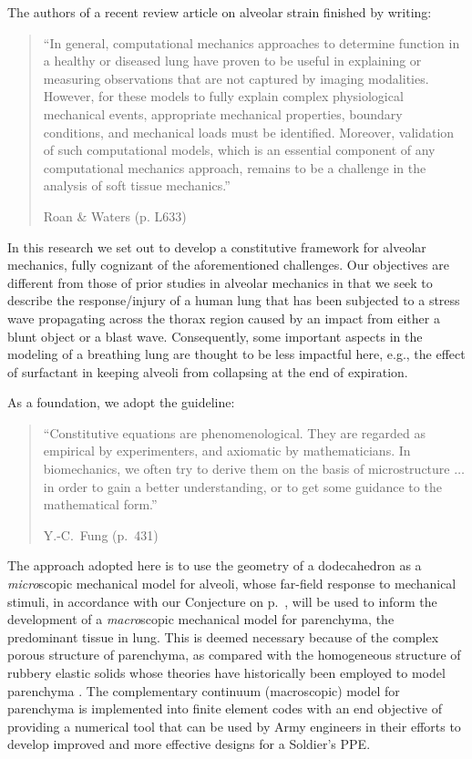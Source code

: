 The authors of a recent review article on alveolar strain finished by writing:
\begin{quotation}
    \noindent\small ``In general, computational mechanics approaches to determine function in a healthy or diseased lung have proven to be useful in explaining or measuring observations that are not captured by imaging modalities. However, for these models to fully explain complex physiological mechanical events, appropriate mechanical properties, boundary conditions, and mechanical loads must be identified. Moreover, validation of such computational models, which is an essential component of any computational mechanics approach, remains to be a challenge in the analysis of soft tissue mechanics.''
    
    \nopagebreak
    \mbox{} \hfill Roan \& Waters \cite{RoanWaters11} (p. L633) \normalsize
\end{quotation}
In this research we set out to develop a constitutive framework for alveolar mechanics, fully cognizant of the aforementioned challenges.  Our objectives are different from those of prior studies in alveolar mechanics in that we seek to describe the response\slash injury of a human lung that has been subjected to a stress wave propagating across the thorax region caused by an impact from either a blunt object or a blast wave.  Consequently, some important aspects in the modeling of a breathing lung are thought to be less impactful here, e.g., the effect of surfactant in keeping alveoli from collapsing at the end of expiration.

As a foundation, we adopt the guideline:
\begin{quotation}
	\noindent\small ``Constitutive equations are phenomenological. They are regarded as empirical by experimenters, and axiomatic by mathematicians.  In biomechanics, we often try to derive them on the basis of micro\-structure $\ldots$ in order to gain a better understanding, or to get some guidance to the mathematical form.''
	
	\nopagebreak
	\mbox{} \hfill Y.-C.~Fung \cite{Fung90} (p.~431) \normalsize
\end{quotation}
The approach adopted here is to use the geometry of a dodecahedron as a \textit{micro}\-scopic mechanical model for alveoli, whose far-field response to mechanical stimuli, in accordance with our Conjecture on p.~\pageref{conjecture}, will be used to inform the development of a \textit{macro\/}scopic mechanical model for parenchyma, \cite{ClaytonFreed20} the predominant tissue in lung.  This is deemed necessary because of the complex porous structure of parenchyma, as compared with the homo\-geneous structure of rubbery elastic solids whose theories have historically been employed to model parenchyma \cite{Fung75,Fungetal78,Vawteretal79,Fung88}.  The complementary continuum (macroscopic) model for parenchyma \cite{Clayton2019TRL,ClaytonFreed20,Clayton2019AIP,claytonBM20,clayton2020TRL} is implemented into finite element codes with an end objective of providing a numerical tool that can be used by Army engineers in their efforts to develop improved and more effective designs for a Soldier's PPE. 

